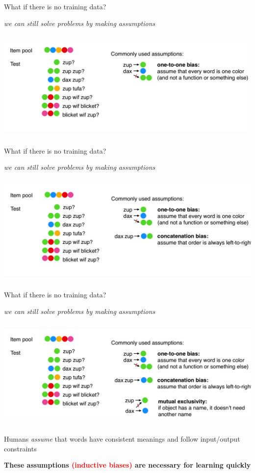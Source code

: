 \documentclass[aspectratio=169,t,handout,xcolor={usenames,dvipsnames}]{beamer}
\begin{document}
\begin{frame}{What if there is no training data?}
\centerline{\textit{we can still solve problems by making assumptions}}
\centering\includegraphics[height=5.5cm]{image/Jietu20220328-192403.jpg}

\end{frame}
\begin{frame}{What if there is no training data?}
\centerline{\textit{we can still solve problems by making assumptions}}
\centering\includegraphics[height=5.5cm]{image/Jietu20220328-192435.jpg}

\end{frame}
\begin{frame}{What if there is no training data?}
\centerline{\textit{we can still solve problems by making assumptions}}
\centering\includegraphics[height=5.5cm]{image/Jietu20220328-192503.jpg}
\pause
\leavevmode\hphantom{ }

\small\centerline{Humans \textit{assume} that words have consistent meanings and follow input/output constraints}
\pause
\small\centerline{\textbf{These assumptions \textcolor{red}{(inductive biases)} are necessary for learning quickly}}
\end{frame}
\end{document}
